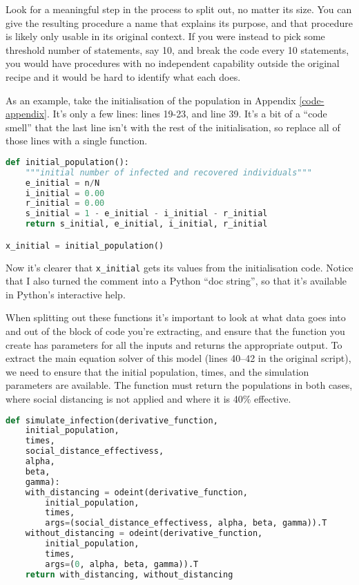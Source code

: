 \documentclass[a4paper]{article}
\begin{document}
Look for a meaningful step in the process to split out, no matter its size.
You can give the resulting procedure a name that explains its purpose, and that procedure is likely only usable in its original context.
If you were instead to pick some threshold number of statements, say 10, and break the code every 10 statements, you would have procedures with no independent capability outside the original recipe and it would be hard to identify what each does.

As an example, take the initialisation of the population in Appendix \ref{code-appendix}.
It's only a few lines: lines 19-23, and line 39.
It's a bit of a ``code smell'' that the last line isn't with the rest of the initialisation, so replace all of those lines with a single function.

\begin{lstlisting}[language=Python]
def initial_population():
    """initial number of infected and recovered individuals"""
    e_initial = n/N
    i_initial = 0.00
    r_initial = 0.00
    s_initial = 1 - e_initial - i_initial - r_initial
    return s_initial, e_initial, i_initial, r_initial

x_initial = initial_population()
\end{lstlisting}

Now it's clearer that \texttt{x\_initial} gets its values from the initialisation code.
Notice that I also turned the comment into a Python ``doc string'', so that it's available in Python's interactive help.

When splitting out these functions it's important to look at what data goes into and out of the block of code you're extracting, and ensure that the function you create has parameters for all the inputs and returns the appropriate output.
To extract the main equation solver of this model (lines 40--42 in the original script), we need to ensure that the initial population, times, and the simulation parameters are available.
The function must return the populations in both cases, where social distancing is not applied and where it is 40\% effective.

\begin{lstlisting}[language=Python]
def simulate_infection(derivative_function,
    initial_population,
    times,
    social_distance_effectivess,
    alpha,
    beta,
    gamma):
    with_distancing = odeint(derivative_function,
        initial_population,
        times,
        args=(social_distance_effectivess, alpha, beta, gamma)).T
    without_distancing = odeint(derivative_function,
        initial_population,
        times,
        args=(0, alpha, beta, gamma)).T
    return with_distancing, without_distancing
\end{lstlisting}
\end{document}
